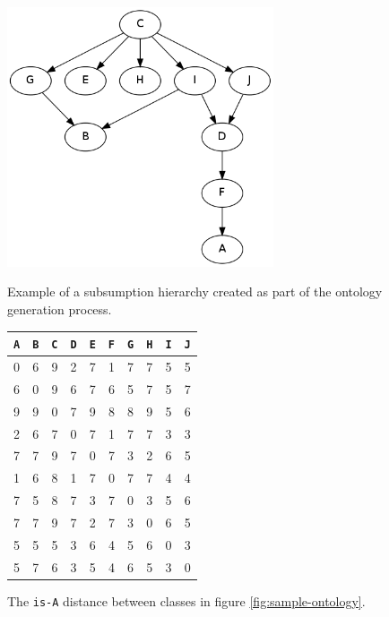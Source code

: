 \begin{figure}[ht]
\begin{minipage}[b]{0.5\linewidth}
\centering
\includegraphics[width=0.7\textwidth]{media/chapter6/sample-ontology.png}
\caption{Example of a subsumption hierarchy created as part of the ontology generation process.}
\label{fig:sample-ontology}
\end{minipage}
\hspace{0.5cm}
\begin{minipage}[b]{0.45\linewidth}

\begin{tabular}{ |c|c|c|c|c|c|c|c|c|c| }
  \hline
  \texttt{A} & \texttt{B} & \texttt{C} & \texttt{D} & \texttt{E} & \texttt{F} & \texttt{G} & \texttt{H} & \texttt{I} & \texttt{J} \\
  \hline
    0  &  6  &  9  &  2  &  7  &  1  &  7  &  7  &  5  &  5 \\
    6  &  0  &  9  &  6  &  7  &  6  &  5  &  7  &  5  &  7 \\
    9  &  9  &  0  &  7  &  9  &  8  &  8  &  9  &  5  &  6 \\
    2  &  6  &  7  &  0  &  7  &  1  &  7  &  7  &  3  &  3 \\
    7  &  7  &  9  &  7  &  0  &  7  &  3  &  2  &  6  &  5 \\
    1  &  6  &  8  &  1  &  7  &  0  &  7  &  7  &  4  &  4 \\
    7  &  5  &  8  &  7  &  3  &  7  &  0  &  3  &  5  &  6 \\
    7  &  7  &  9  &  7  &  2  &  7  &  3  &  0  &  6  &  5 \\
    5  &  5  &  5  &  3  &  6  &  4  &  5  &  6  &  0  &  3 \\
    5  &  7  &  6  &  3  &  5  &  4  &  6  &  5  &  3  &  0 \\
  \hline
\end{tabular}
\caption{The \texttt{is-A} distance between classes in figure \ref{fig:sample-ontology}.}
\label{tbl:semantic-distance}

\end{minipage}
\end{figure}